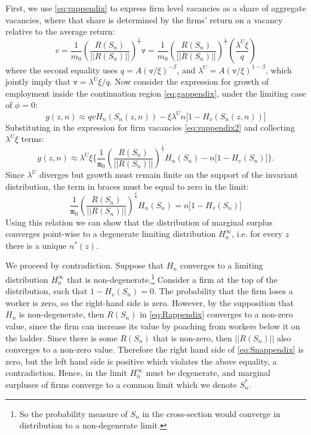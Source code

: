 First, we use \eqref{eq:vappendix} to express firm level vacancies as a share of aggregate vacancies, where that share is determined by the firms' return on a vacancy relative to the average return:
\begin{equation}\label{eq:vappendix2}
v
=\frac{1}{m_{0}}\left(\frac{R\left(S_{n}\right)}{||R\left(S_{n}\right)||}\right)^{\frac{1}{\gamma}}\mathtt{v}
=\frac{1}{m_{0}}\left(\frac{R\left(S_{n}\right)}{||R\left(S_{n}\right)||}\right)^{\frac{1}{\gamma}}\left(\frac{\lambda^U\xi}{q}\right)
\end{equation}
where the second equality uses $q=A(\mathtt{v}/\xi)^{-\beta}$, and $\lambda^U = A(\mathtt{v}/\xi)^{1-\beta}$, which jointly imply that $\mathtt{v} = \lambda^U\xi/q$.
Now consider the expression for growth of employment inside the continuation region \eqref{eq:gappendix}, under the limiting case of $\phi=0$:
\[
g(z,n)\approx q v H_{n}\left(S_{n}(z,n)\right) -\xi
\lambda^{U}n\Big[1-H_{v}\left(S_{n}(z,n)\right)\Big]
\]
Substituting in the expression for firm vacancies \eqref{eq:vappendix2} and collecting $\lambda^U\xi$ terms:
\begin{equation*}
g(z,n)\approx \lambda ^{U}\xi \Bigg\{\frac{1}{\mathtt{m}_0}\left(\frac{R(S_{n})}{||R(S_{n})||}\right)^{\frac{1}{\gamma}}H_{n}(S_{n})
- n\Big[1-H_{v}(S_{n})\Big]\Bigg\}.
\end{equation*}
Since $\lambda ^{U}$ diverges but growth must remain finite on the support of the invariant distribution, the term in braces must be equal to zero in the limit:
\begin{equation}
\frac{1}{\mathtt{m}_0}\left(\frac{R(S_{n})}{||R(S_{n})||}\right)^{\frac{1}{\gamma}}H_{n}(S_{n})
= n\Big[1-H_{v}(S_{n})\Big] \label{eq:Snappendix}
\end{equation}
Using this relation we can show that the distribution of marginal surplus converges point-wise to a degenerate limiting distribution $H_n^\infty$, i.e. for every $z$ there is a unique $n^{\ast}(z)$.

We proceed by contradiction.
Suppose that $H_n$ converges to a limiting distribution $H_n^\infty$ that is non-degenerate.\footnote{
    So the probability measure of $S_n$ in the cross-section would converge in distribution to a non-degenerate limit.}
Consider a firm at the top of the distribution, such that $1-H_v(S_n) = 0$.
The probability that the firm loses a worker is zero, so the right-hand side is zero.
However, by the supposition that $H_n$ is non-degenerate, then $R(S_n)$ in \eqref {eq:Rappendix} converges to a non-zero value, since the firm can increase its value by poaching from workers below it on the ladder.
Since there is some $R(S_n)$ that is non-zero, then $||R(S_n)||$ also converges to a non-zero value.
Therefore the right hand side of \eqref{eq:Snappendix} is zero, but the left hand side is positive which violates the above equality, a contradiction.
Hence, in the limit $H_n^\infty$ must be degenerate, and marginal surpluses of firms converge to a common limit which we denote $S_{n}^{\ast }$.


